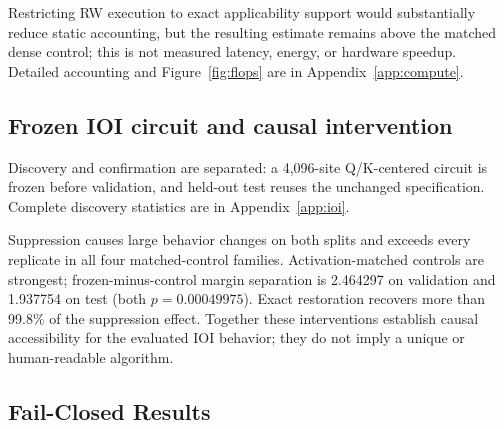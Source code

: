 \documentclass{article}
\begin{document}
Restricting RW execution to exact applicability support would substantially
reduce static accounting, but the resulting estimate remains above the matched
dense control; this is not measured latency, energy, or hardware speedup. Detailed accounting and
Figure~\ref{fig:flops} are in Appendix~\ref{app:compute}.

\subsection{Frozen IOI circuit and causal intervention}
\label{sec:causal}

Discovery and confirmation are separated: a 4,096-site Q/K-centered circuit is
frozen before validation, and held-out test reuses the unchanged specification.
Complete discovery statistics are in Appendix~\ref{app:ioi}.

\begin{table}[t]
\centering
\caption{Frozen IOI circuit results. Accuracy arrows show intact to
suppressed. Recovery is the fraction of the suppression effect recovered by
exact same-example numerator restoration.}
\label{tab:ioi}
\small
{}
\end{table}

Suppression causes large behavior changes on both splits and exceeds every
replicate in all four matched-control families. Activation-matched controls are
strongest; frozen-minus-control margin separation is 2.464297 on validation and
1.937754 on test (both \(p=0.00049975\)). Exact restoration recovers more than
99.8\% of the suppression effect. Together these interventions establish causal
accessibility for the evaluated IOI behavior; they do not imply a unique or
human-readable algorithm.

\subsection{Fail-Closed Results}
\label{sec:negatives}
\end{document}
